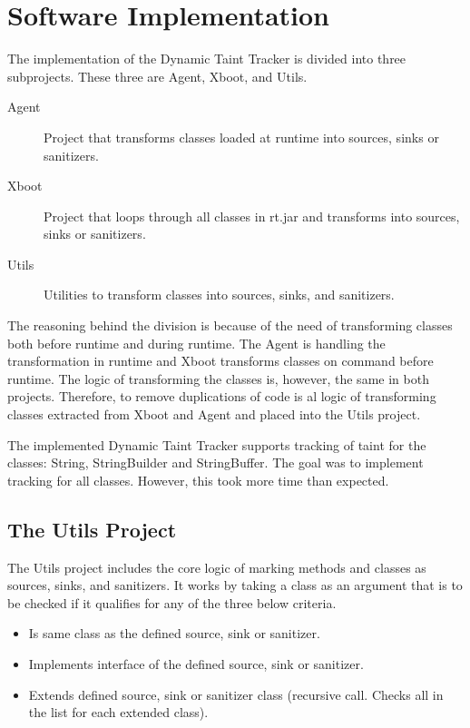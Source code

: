 \section{Software Implementation}
\label{SoftwareArchitecture}
The implementation of the Dynamic Taint Tracker is divided into three subprojects. These three are Agent, Xboot, and Utils. 

\hfill
\begin{description}
    \item[Agent] Project that transforms classes loaded at runtime into sources, sinks or sanitizers.
    \item[Xboot] Project that loops through all classes in rt.jar and transforms into sources, sinks or sanitizers.
    \item[Utils] Utilities to transform classes into sources, sinks, and sanitizers. 
\end{description}
\hfill

The reasoning behind the division is because of the need of transforming classes both before runtime and during runtime. The Agent is handling the transformation in runtime and Xboot transforms classes on command before runtime. The logic of transforming the classes is, however, the same in both projects. Therefore, to remove duplications of code is al logic of transforming classes extracted from Xboot and Agent and placed into the Utils project.

The implemented Dynamic Taint Tracker supports tracking of taint for the classes: String, StringBuilder and StringBuffer. The goal was to implement tracking for all classes. However, this took more time than expected.



\subsection{The Utils Project}
The Utils project includes the core logic of marking methods and classes as sources, sinks, and sanitizers. It works by taking a class as an argument that is to be checked if it qualifies for any of the three below criteria.

\hfill
\begin{itemize}
    \item Is same class as the defined source, sink or sanitizer.
    \item Implements interface of the defined source, sink or sanitizer.
    \item Extends defined source, sink or sanitizer class (recursive call. Checks all in the list for each extended class). 
\end{itemize}
\hfill

